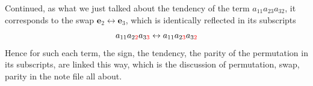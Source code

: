 \documentclass{article}
\begin{document}
Continued, as what we just talked about the tendency of the term $a_{11}a_{23}a_{32}$, it corresponds to the swap $\pmb{e}_2\leftrightarrow\pmb{e}_3$, which is identically reflected in its subscripts
$$ a_{11}a_{2\textcolor{red}{2}}a_{3\textcolor{red}{3}} \leftrightarrow a_{11}a_{2\textcolor{red}{3}}a_{3\textcolor{red}{2}} $$
Hence for such each term, the sign, the tendency, the parity of the permutation in its subscripts, are linked this way, which is the discussion of permutation, swap, parity in the note file all about.
\end{document}
